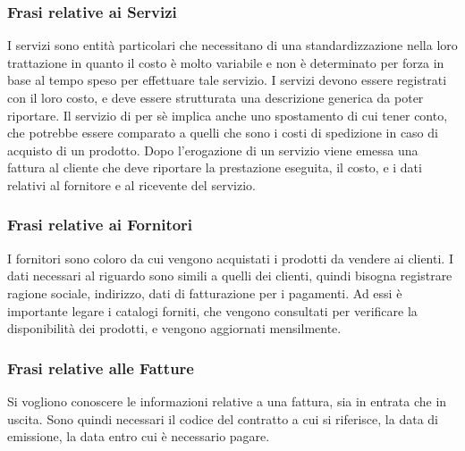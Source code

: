 \subsubsection{Frasi relative ai Servizi}
I servizi sono entità particolari che necessitano di una standardizzazione nella loro trattazione in quanto il costo è molto variabile e non è determinato per forza in base al tempo speso per effettuare tale servizio. I servizi devono essere registrati con il loro costo, e deve essere strutturata una descrizione generica da poter riportare. Il servizio di per sè implica anche uno spostamento di cui tener conto, che potrebbe essere comparato a quelli che sono i costi di spedizione in caso di acquisto di un prodotto.\newline
Dopo l'erogazione di un servizio viene emessa una fattura al cliente che deve riportare la prestazione eseguita, il costo, e i dati relativi al fornitore e al ricevente del servizio.

\subsubsection{Frasi relative ai Fornitori}
I fornitori sono coloro da cui vengono acquistati i prodotti da vendere ai clienti. I dati necessari al riguardo sono simili a quelli dei clienti, quindi bisogna registrare ragione sociale, indirizzo, dati di fatturazione per i pagamenti. Ad essi è importante legare i catalogi forniti, che vengono consultati per verificare la disponibilità dei prodotti, e vengono aggiornati mensilmente.

\subsubsection{Frasi relative alle Fatture}
Si vogliono conoscere le informazioni relative a una fattura, sia in entrata che in uscita. Sono quindi necessari il codice del contratto a cui si riferisce, la data di emissione, la data entro cui è necessario pagare.

